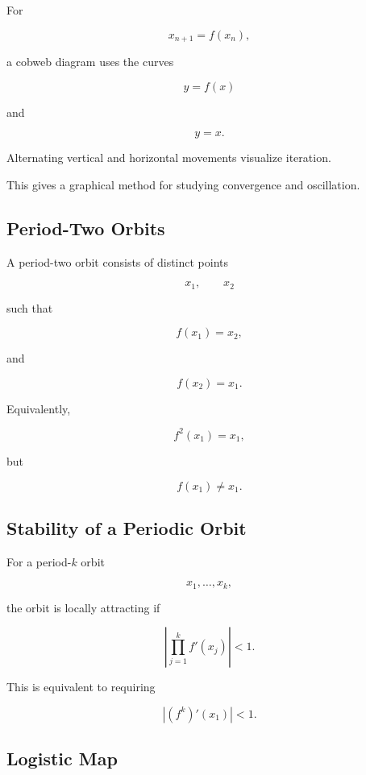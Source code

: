 For

\[
x_{n+1}=f(x_n),
\]

a cobweb diagram uses the curves

\[
\boxed{
y=f(x)
}
\]

and

\[
\boxed{
y=x.
}
\]

Alternating vertical and horizontal movements visualize iteration.

This gives a graphical method for studying convergence and oscillation.

\subsection{Period-Two Orbits}
\label{subsec:period-two-orbits}

A period-two orbit consists of distinct points

\[
x_1,
\qquad
x_2
\]

such that

\[
\boxed{
f(x_1)=x_2,
}
\]

and

\[
\boxed{
f(x_2)=x_1.
}
\]

Equivalently,

\[
\boxed{
f^2(x_1)=x_1,
}
\]

but

\[
\boxed{
f(x_1)\neq x_1.
}
\]

\subsection{Stability of a Periodic Orbit}
\label{subsec:periodic-orbit-map-stability}

For a period-\(k\) orbit

\[
x_1,\ldots,x_k,
\]

the orbit is locally attracting if

\[
\boxed{
\left|
\prod_{j=1}^{k}
f'(x_j)
\right|
<
1.
}
\]

This is equivalent to requiring

\[
\boxed{
|
(f^k)'(x_1)
|<1.
}
\]

\subsection{Logistic Map}
\label{subsec:logistic-map}

